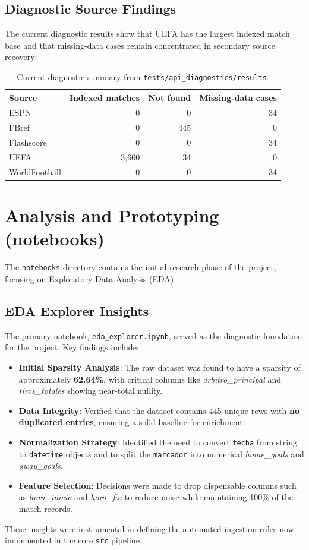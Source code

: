 \documentclass[12pt,a4paper]{article}
\begin{document}
\subsection{Diagnostic Source Findings}
The current diagnostic results show that UEFA has the largest indexed match base and that missing-data cases remain concentrated in secondary source recovery:

\begin{table}[H]
\centering
\small
\begin{tabular}{lrrr}
\toprule
\textbf{Source} & \textbf{Indexed matches} & \textbf{Not found} & \textbf{Missing-data cases} \\
\midrule
ESPN & 0 & 0 & 34 \\
FBref & 0 & 445 & 0 \\
Flashscore & 0 & 0 & 34 \\
UEFA & 3,600 & 34 & 0 \\
WorldFootball & 0 & 0 & 34 \\
\bottomrule
\end{tabular}
\caption{Current diagnostic summary from \texttt{tests/api\_diagnostics/results}.}
\label{tab:source_diagnostics}
\end{table}

\section{Analysis and Prototyping (notebooks)}
The \texttt{notebooks} directory contains the initial research phase of the project, focusing on Exploratory Data Analysis (EDA).

\subsection{EDA Explorer Insights}
The primary notebook, \texttt{eda\_explorer.ipynb}, served as the diagnostic foundation for the project. Key findings include:
\begin{itemize}
    \item \textbf{Initial Sparsity Analysis}: The raw dataset was found to have a sparsity of approximately \textbf{62.64\%}, with critical columns like \textit{arbitro\_principal} and \textit{tiros\_totales} showing near-total nullity.
    \item \textbf{Data Integrity}: Verified that the dataset contains 445 unique rows with \textbf{no duplicated entries}, ensuring a solid baseline for enrichment.
    \item \textbf{Normalization Strategy}: Identified the need to convert \texttt{fecha} from string to \texttt{datetime} objects and to split the \texttt{marcador} into numerical \textit{home\_goals} and \textit{away\_goals}.
    \item \textbf{Feature Selection}: Decisions were made to drop dispensable columns such as \textit{hora\_inicio} and \textit{hora\_fin} to reduce noise while maintaining 100\% of the match records.
\end{itemize}
These insights were instrumental in defining the automated ingestion rules now implemented in the core \texttt{src} pipeline.
\end{document}
